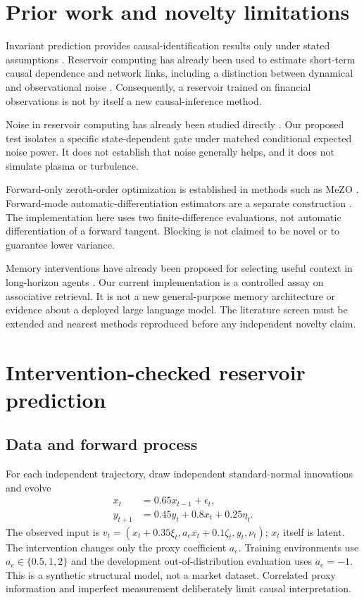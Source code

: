 \documentclass[10pt]{article}
\begin{document}
\section{Prior work and novelty limitations}
Invariant prediction provides causal-identification results only under stated assumptions \cite{peters}. Reservoir computing has already been used to estimate short-term causal dependence and network links, including a distinction between dynamical and observational noise \cite{banerjee}. Consequently, a reservoir trained on financial observations is not by itself a new causal-inference method.

Noise in reservoir computing has already been studied directly \cite{nathe}. Our proposed test isolates a specific state-dependent gate under matched conditional expected noise power. It does not establish that noise generally helps, and it does not simulate plasma or turbulence.

Forward-only zeroth-order optimization is established in methods such as MeZO \cite{malladi}. Forward-mode automatic-differentiation estimators are a separate construction \cite{baydin}. The implementation here uses two finite-difference evaluations, not automatic differentiation of a forward tangent. Blocking is not claimed to be novel or to guarantee lower variance.

Memory interventions have already been proposed for selecting useful context in long-horizon agents \cite{srivastava}. Our current implementation is a controlled assay on associative retrieval. It is not a new general-purpose memory architecture or evidence about a deployed large language model. The literature screen must be extended and nearest methods reproduced before any independent novelty claim.

\section{Intervention-checked reservoir prediction}
\subsection{Data and forward process}
For each independent trajectory, draw independent standard-normal innovations and evolve
\begin{align}
 x_t &=0.65x_{t-1}+\epsilon_t,\\
 y_{t+1}&=0.45y_t+0.8x_t+0.25\eta_t.
\end{align}
The observed input is $v_t=(x_t+0.35\xi_t,a_e x_t+0.1\zeta_t,y_t,\nu_t)$; $x_t$ itself is latent. The intervention changes only the proxy coefficient $a_e$. Training environments use $a_e\in\{0.5,1,2\}$ and the development out-of-distribution evaluation uses $a_e=-1$. This is a synthetic structural model, not a market dataset. Correlated proxy information and imperfect measurement deliberately limit causal interpretation.
\end{document}
